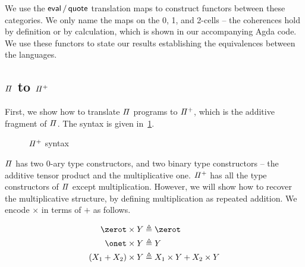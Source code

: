We use the $\evalt/\quotet$ translation maps to construct functors between these categories. We only name the maps on
the 0, 1, and 2-cells -- the coherences hold by definition or by calculation, which is shown in our accompanying Agda
code. We use these functors to state our results establishing the equivalences between the languages.

\subsection{$\mathit{\Pi}$ to $\mathit{{\Pi}^{+}}$}

First, we show how to translate $\mathit{\Pi}$ programs to $\mathit{{\Pi}^{+}}$, which is the additive fragment of $\mathit{\Pi}$. The
syntax is given in~\cref{fig:piplus}.

\begin{figure}[t]
  {}

  {}
  \caption{$\mathit{{\Pi}^{+}}$ syntax}
  \label{fig:piplus}
\end{figure}

$\mathit{\Pi}$ has two 0-ary type constructors, and two binary type constructors -- the additive tensor product and the
multiplicative one. $\mathit{{\Pi}^{+}}$ has all the type constructors of $\mathit{\Pi}$ except multiplication. However, we will
show how to recover the multiplicative structure, by defining multiplication as repeated addition. We encode $\times$ in
terms of $+$ as follows.

\begin{definition}[$\times : \UPlus \to \UPlus \to \UPlus$]
  \begin{align*}
    \zerot \times Y      & \defeq \zerot                      \\
    \onet \times Y       & \defeq Y                           \\
    (X_1 + X_2) \times Y & \defeq X_1 \times Y + X_2 \times Y
  \end{align*}
\end{definition}

